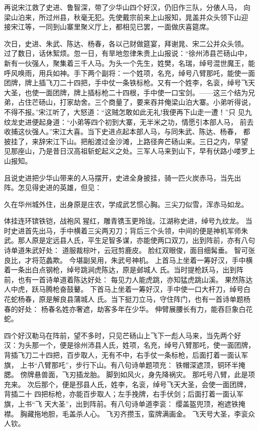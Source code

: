 再说宋江救了史进、鲁智深，带了少华山四个好汉，仍旧作三队，分俵人马，
向梁山泊来，所过州县，秋毫无犯。先使戴宗前来上山报知，晁盖并众头领下山迎
接宋江等，一同到山寨里聚义厅上，都相见已罢，一面做庆喜筵席。

次日，史进、朱武、陈达、杨春，各以己财做筵宴，拜谢晁、宋二公并众头领。
过了数日，话休絮烦。忽一日，有旱地忽律朱贵上山报说：“徐州沛县芒砀山中，
新有一伙强人，聚集着三千人马。为头一个先生，姓樊，名瑞，绰号混世魔王，能
呼风唤雨，用兵如神。手下两个副将：一个姓项，名充，绰号八臂那吒，能使一面
团牌，牌上插飞刀二十四把，手中仗一条铁标枪。又有一个姓李，名衮，绰号飞天
大圣，也使一面团牌，牌上插标枪二十四根，手中使一口宝剑。——这三个结为兄
弟，占住芒砀山，打家劫舍。三个商量了，要来吞并俺梁山泊大寨。小弟听得说，
不得不报。”宋江听了，大怒道：“这贼怎敢如此无礼!我便再下山走一遭！”只
见九纹龙史进便起身道：“小弟等四个初到大寨，无半米之功，情愿引本部人马，
前去收捕这伙强人。”宋江大喜。当下史进点起本部人马，与同朱武、陈达、杨春，
都披挂了，来辞宋江下山。把船渡过金沙滩，上路径奔芒砀山来。三日之内，早望
见那座山，乃是昔日汉高祖斩蛇起义之处。三军人马来到山下，早有伏路小喽罗上
山报知。

且说史进把少华山带来的人马摆开，史进全身披挂，骑一匹火炭赤马，当先出
阵。怎见得史进的英雄，但见：

久在华州城外住，出身原是庄农，学成武艺惯心胸。三尖刀似雪，浑赤马如龙。

体挂连环镔铁铠，战袍风猩红，雕青镌玉更玲珑。江湖称史进，绰号九纹龙。
当时史进首先出马，手中横着三尖两刃刀；背后三个头领，中间的便是神机军师朱
武。那人原是定远县人氏，平生足智多谋，亦能使两口双刀，出到阵前，亦有八句
诗单道朱武好处：
道服裁棕叶，云冠剪鹿皮。
脸红双眼俊，面目细髯垂。
智可张良比，才将范蠡欺。
今堪副吴用，朱武号神机。
上首马上坐着一筹好汉，手中横着一条出白点钢枪，绰号跳涧虎陈达，原是邺城人
氏。当时提枪跃马，出到阵前，也有一首诗单道着陈达好处：
每见力人能虎跳，亦知猛虎跳山溪。
果然陈达人中虎，跃马腾枪奋鼓鼙。
下首马上坐着一筹好汉，手中使一口大杆刀，绰号白花蛇杨春，原是解良县蒲城人
氏。当下挺刀立马，守住阵门，也有一首诗单题杨春的好处：
杨春名姓亦奢遮，劫客多年在少华。
伸臂展腰长有力，能吞巨象白花蛇。

四个好汉勒马在阵前，望不多时，只见芒砀山上飞下一彪人马来，当先两个好
汉：为头那一个，便是徐州沛县人氏，姓项，名充，绰号八臂那吒，使一面团牌，
背插飞刀二十四把，百步取人，无有不中，右手仗一条标枪，后面打着一面认军旗，
上书“八臂那吒”，步行下山。有八句诗单题项充：
铁帽深遮顶，铜环半掩腮。
傍牌悬兽面，飞刃插龙胎。
脚到如风火，身先降祸灾。
那吒号八臂，此是项充来。
次后那个，便是邳县人氏，姓李，名衮，绰号飞天大圣，会使一面团牌，背插二十
四把标枪，亦能百步取人；左手挽牌，右手伏剑；后面打着一面认军旗，上书“飞
天大圣”，出到阵前。有八句诗单道李衮：
缨盖盔兜顶，袍遮铁掩襟。
胸藏拖地胆，毛盖杀人心。
飞刃齐攒玉，蛮牌满画金。
飞天号大圣，李衮众人钦。


